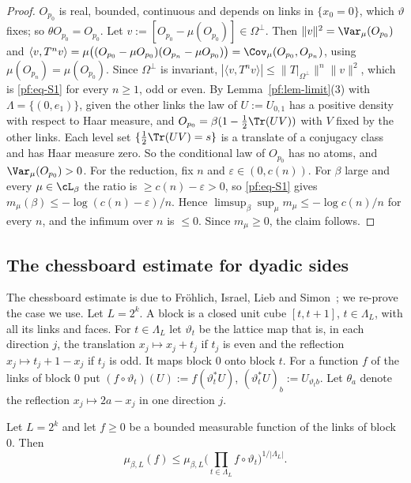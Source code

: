 \begin{proof}
$O_{p_0}$ is real, bounded, continuous and depends on links in $\{x_0=0\}$, which $\vartheta$ fixes; so $\theta O_{p_0}=O_{p_0}$. Let $v:=[O_{p_0}-\mu(O_{p_0})]\in\Omega^\perp$. Then $\|v\|^2=\Var_\mu(O_{p_0})$ and $\langle v,T^nv\rangle=\mu\big((O_{p_0}-\mu O_{p_0})(O_{p_n}-\mu O_{p_0})\big)=\Cov_\mu(O_{p_0},O_{p_n})$, using $\mu(O_{p_n})=\mu(O_{p_0})$. Since $\Omega^\perp$ is invariant, $|\langle v,T^nv\rangle|\le\|T|_{\Omega^\perp}\|^n\|v\|^2$, which is \eqref{pf:eq-S1} for every $n\ge1$, odd or even.
By Lemma~\ref{pf:lem-limit}(3) with $\Lambda=\{(0,e_1)\}$, given the other links the law of $U:=U_{0,1}$ has a positive density with respect to Haar measure, and $O_{p_0}=\beta(1-\tfrac12\Tr(UV))$ with $V$ fixed by the other links. Each level set $\{\tfrac12\Tr(UV)=s\}$ is a translate of a conjugacy class and has Haar measure zero. So the conditional law of $O_{p_0}$ has no atoms, and $\Var_\mu(O_{p_0})>0$.
For the reduction, fix $n$ and $\varepsilon\in(0,c(n))$. For $\beta$ large and every $\mu\in\cL_\beta$ the ratio is $\ge c(n)-\varepsilon>0$, so \eqref{pf:eq-S1} gives $m_\mu(\beta)\le-\log(c(n)-\varepsilon)/n$. Hence $\limsup_\beta\sup_\mu m_\mu\le-\log c(n)/n$ for every $n$, and the infimum over $n$ is $\le0$. Since $m_\mu\ge0$, the claim follows.
\end{proof}

\subsection{The chessboard estimate for dyadic sides}\label{pf:sec-chess}

The chessboard estimate is due to Fr\"ohlich, Israel, Lieb and Simon~\cite{FILS78}; we re-prove the case we use. Let $L=2^k$. A block is a closed unit cube $[t,t+1]$, $t\in\Lambda_L$, with all its links and faces. For $t\in\Lambda_L$ let $\vartheta_t$ be the lattice map that is, in each direction $j$, the translation $x_j\mapsto x_j+t_j$ if $t_j$ is even and the reflection $x_j\mapsto t_j+1-x_j$ if $t_j$ is odd. It maps block $0$ onto block $t$. For a function $f$ of the links of block $0$ put $(f\circ\vartheta_t)(U):=f(\vartheta_t^*U)$, $(\vartheta_t^*U)_b:=U_{\vartheta_tb}$. Let $\theta_a$ denote the reflection $x_j\mapsto2a-x_j$ in one direction $j$.

\begin{lemma}\label{pf:lem-chess}
Let $L=2^k$ and let $f\ge0$ be a bounded measurable function of the links of block $0$. Then
\[
\mu_{\beta,L}(f)\le\mu_{\beta,L}\Big(\prod_{t\in\Lambda_L}f\circ\vartheta_t\Big)^{1/|\Lambda_L|}.
\]
\end{lemma}

